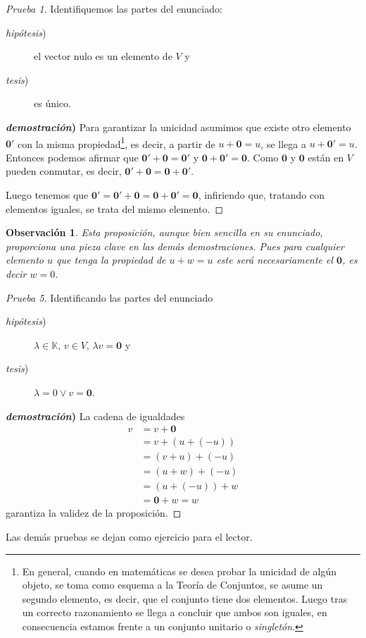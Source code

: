 \documentclass[b5paper, 11pt]{book}
\newcommand{\0}{\mathbf{0}}
\newcommand{\K}{\mathds{K}}
\newtheorem{obs}{Observación}[chapter]
\theoremstyle{estiloB}
\theoremstyle{estiloC}
\theoremstyle{estiloD}
\theoremstyle{estiloE}
\begin{document}
\begin{proof}[Prueba 1]Identifiquemos las partes del enunciado:
\begin{description}
\item[\textit{hipótesis})] el vector nulo es un elemento de $V$ y
\item[\textit{tesis})] es único.
\end{description}
\textbf{\textit{demostración})} Para garantizar la unicidad asumimos que existe otro elemento $\0 '$ con la misma propiedad\footnote{En general, cuando en matemáticas se desea probar la unicidad de algún objeto, se toma como esquema a la Teoría de Conjuntos, se asume un segundo elemento, es decir, que el conjunto tiene dos elementos. Luego tras un correcto razonamiento se llega a concluir que ambos son iguales, en consecuencia estamos frente a un conjunto unitario o \textit{singletón}.}, es decir, a partir de $u + \0= u$, se llega a $u +\0 '=u $. Entonces podemos afirmar que $\0 '+ \0= \0 '$ y $\0 + \0 '=\0$. Como $\0$ y $\0$ están en $V$ pueden conmutar, es decir, $\0 '+ \0 = \0 + \0 ' $. 

Luego tenemos que $\0 ' =\0 '+ \0 = \0 + \0 ' = \0$, infiriendo que, tratando con elementos iguales, se trata del mismo elemento.
\end{proof}

\begin{obs}
Esta proposición, aunque bien sencilla en su enunciado, proporciona una pieza clave en las demás demostraciones. Pues para cualquier elemento $u$ que tenga la propiedad de $u+ w= u$ este será necesariamente el $\0$, es decir $w=0$.
\end{obs}

\begin{proof}[Prueba 5]Identificando las partes del enunciado
\begin{description}
\item[\textit{hipótesis})] $\lambda \in \K$, $v \in V$, $\lambda v= \0$ y
\item[\textit{tesis})] $\lambda =0 \vee v= \0$.
\end{description}
\textbf{\textit{demostración})} La cadena de igualdades
\begin{align*}
v 	&= v +\0\\
	&= v+ (u + (-u))\\
	&= (v+u) + (-u)\\
	&= (u+ w)+ (-u) \tag{por hipótesis}\\
	&= (u + (-u)) + w\\
	&= \0 + w= w
\end{align*}
garantiza la validez de la proposición.
\end{proof}
Las demás pruebas se dejan como ejercicio para el lector.
\end{document}
